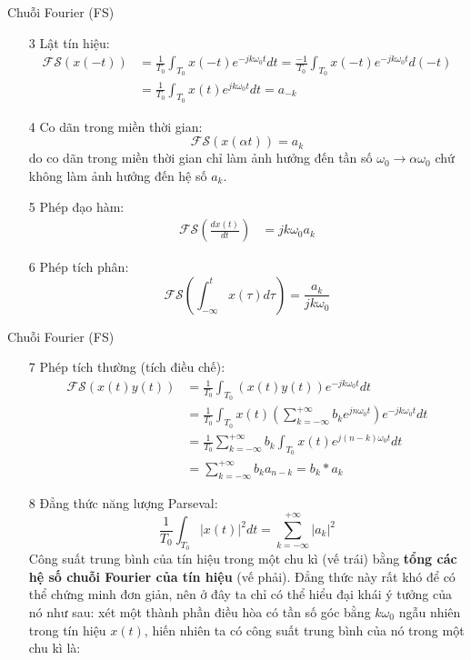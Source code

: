 \documentclass[8pt]{beamer}
\begin{document}
\begin{frame}{Chuỗi Fourier (FS)}
\begin{enumerate}
	\item[3] Lật tín hiệu:
\begin{equation*}
\begin{split}
	\mathscr{FS}(x(-t))&=\frac{1}{T_{0}}\int_{T_{0}}x(-t)e^{-jk\omega_{0}t}dt=\frac{-1}{T_{0}}\int_{T_{0}}x(-t)e^{-jk\omega_{0}t}d(-t)\\
			   &= \frac{1}{T_{0}}\int_{T_{0}}x(t)e^{jk\omega_{0}t}dt=a_{-k}
\end{split}
\end{equation*}
\item[4] Co dãn trong miền thời gian:
$$\mathscr{FS}(x(\alpha t))=a_{k}$$
do co dãn trong miền thời gian chỉ làm ảnh hưởng đến tần số $\omega_{0}\to \alpha\omega_{0}$ chứ không làm ảnh hưởng đến hệ số $a_{k}$.
\item[5] Phép đạo hàm:
\begin{equation*}
\begin{split}
\mathscr{FS}\left(\frac{dx(t)}{dt}\right)&=jk\omega_{0}a_{k}
\end{split}
\end{equation*}
\item [6] Phép tích phân:
	$$\mathscr{FS}\left(\int_{-\infty}^{t}x(\tau)d\tau\right)=\frac{a_{k}}{jk\omega_{0}}$$
\end{enumerate}
\end{frame}
\begin{frame}{Chuỗi Fourier (FS)}
	\begin{enumerate}
\item[7] Phép tích thường (tích điều chế):
\begin{equation*}
\begin{split}
	\mathscr{FS}(x(t)y(t))&=\frac{1}{T_{0}}\int_{T_{0}}(x(t)y(t))e^{-jk\omega_{0}t}dt\\&=\frac{1}{T_{0}}\int_{T_{0}}x(t)\left(\sum_{k=-\infty}^{+\infty}b_{k}e^{jn\omega_{0}t}\right)e^{-jk\omega_{0}t}dt\\&=\frac{1}{T_{0}}\sum_{k=-\infty}^{+\infty}b_{k}\int_{T_{0}}x(t)e^{j(n-k)\omega_{0}t}dt\\&=\sum_{k=-\infty}^{+\infty}b_{k}a_{n-k}=b_{k}*a_{k}
\end{split}
\end{equation*}
\item[8] Đẳng thức năng lượng Parseval: 
$$\frac{1}{T_{0}}\int_{T_{0}}|x(t)|^2dt=\sum_{k=-\infty}^{+\infty}|a_{k}|^2$$
Công suất trung bình của tín hiệu trong một chu kì (vế trái) bằng \textbf{tổng các hệ số chuỗi Fourier của tín hiệu} (vế phải). Đẳng thức này rất khó để có thể chứng minh đơn giản, nên ở đây ta chỉ có thể hiểu đại khái ý tưởng của nó như sau: xét một thành phần điều hòa có tần số góc bằng $k\omega_{0}$ ngẫu nhiên trong tín hiệu $x(t)$, hiến nhiên ta có công suất trung bình của nó trong một chu kì là:
	\end{enumerate}
\end{frame}
\end{document}
